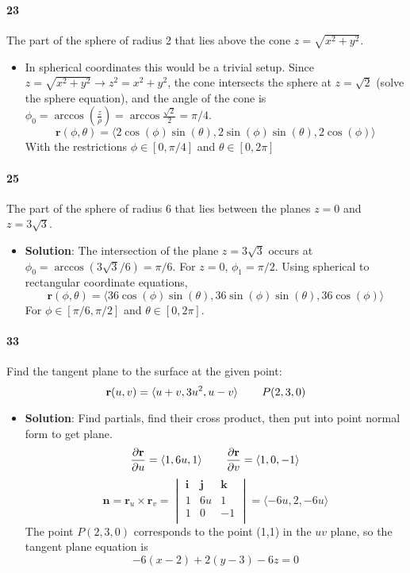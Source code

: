 \documentclass{article}
\newcommand{\parf}[2]{\frac{\partial #1}{\partial #2}}
\begin{document}
    \paragraph{23} The part of the sphere of radius 2 that lies above the cone $z=\sqrt{x^2+y^2}$.
    \begin{itemize}
        \item In spherical coordinates this would be a trivial setup. Since $z=\sqrt{x^2+y^2} \rightarrow z^2 = x^2 +y^2$, the cone intersects the sphere at $z=\sqrt{2}$ (solve the sphere equation), and the angle of the cone is $\phi_0 = \arccos(\frac{z}{\rho}) = \arccos{\frac{\sqrt{2}}{2}} = \pi/4$.
        \[ \mathbf{r}(\phi,\theta) = \langle 2\cos(\phi)\sin(\theta), 2\sin(\phi)\sin(\theta), 2\cos(\phi)\rangle \]
        With the restrictions $\phi \in [0,\pi/4]$ and $\theta \in [0,2\pi]$
    \end{itemize}
    
    \paragraph{25} The part of the sphere of radius 6 that lies between the planes $z=0$ and $z=3\sqrt{3}$.
    \begin{itemize}
        \item \textbf{Solution}: The intersection of the plane $z=3\sqrt{3}$ occurs at $\phi_0 = \arccos(3\sqrt{3}/6) = \pi/6$. For $z=0$, $\phi_1 = \pi/2$. Using spherical to rectangular coordinate equations,
        \[ \mathbf{r}(\phi,\theta) = \langle 36\cos(\phi)\sin(\theta), 36\sin(\phi)\sin(\theta), 36\cos(\phi) \rangle \]
        For $\phi \in [\pi/6, \pi/2]$ and $\theta \in [0,2\pi]$.
    \end{itemize}
    
    \paragraph{33} Find the tangent plane to the surface at the given point:
    \[ 
        \mathbf{r}(u,v) = \langle u+v, 3u^2, u-v \rangle
        \hspace{0.3in} P(2,3,0)
    \]
    \begin{itemize}
        \item \textbf{Solution}: Find partials, find their cross product, then put into point normal form to get plane.
        \[\parf{\mathbf{r}}{u} = \langle 1, 6u, 1 \rangle \hspace{0.3in} \parf{\mathbf{r}}{v} = \langle 1, 0, -1 \rangle \]
        \[
            \mathbf{n} = \mathbf{r}_u \times \mathbf{r}_v= 
            \begin{vmatrix} 
                \mathbf{i} & \mathbf{j} & \mathbf{k}\\
                1 & 6u & 1 \\
                1 & 0 & -1\\
            \end{vmatrix}
            = \langle -6u, 2, -6u \rangle
        \]
        The point $P(2,3,0)$ corresponds to the point (1,1) in the $uv$ plane, so the tangent plane equation is
        \[ -6(x-2) + 2(y-3) -6z = 0 \]
    \end{itemize}
    
\end{document}
